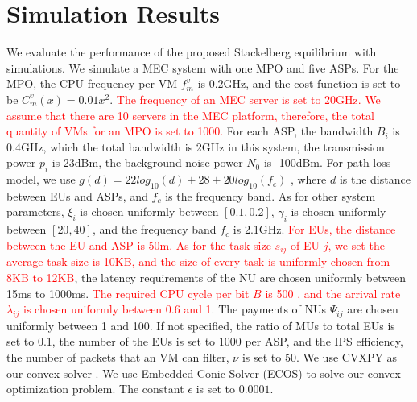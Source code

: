 \documentclass[10pt,journal, compsoc]{IEEEtran}
\begin{document}
\section{Simulation Results} \label{sec:simulation}
We evaluate the performance of the proposed Stackelberg equilibrium with simulations. We simulate a MEC system with one MPO and five ASPs\cite{Zhang3}\cite{Xu2}. For the MPO, the CPU frequency per VM $f_m^v$ is 0.2GHz, and the cost function is set to be $C_m^v(x) = 0.01x^2$. \textcolor{red}{The frequency of an MEC server is set to 20GHz\cite{Liu4}. We assume that there are 10 servers in the MEC platform, therefore, the total quantity of VMs for an MPO is set to 1000.} For each ASP, the bandwidth $B_i$ is 0.4GHz, which the total bandwidth is 2GHz in this system, the transmission power $p_i$ is 23dBm\cite{3gpp.36.101}, the background noise power $N_0$ is -100dBm\cite{chen2015efficient}. For path loss model, we use $g(d)=22log_{10}(d)+28+20log_{10}(f_c)$ \cite{3gpp.36.814}, where $d$ is the distance between EUs and ASPs, and $f_c$ is the frequency band. As for other system parameters, $\xi_{i}$ is chosen uniformly between $[0.1, 0.2]$, $\gamma_i$ is chosen uniformly between $[20, 40]$, and the frequency band $f_c$ is 2.1GHz\cite{Chang3}. \textcolor{red}{For EUs, the distance between the EU and ASP is 50m\cite{Mao}. As for the task size $s_{ij}$ of EU $j$, we set the average task size is 10KB\cite{Ko}, and the size of every task is uniformly chosen from 8KB to 12KB}, the latency requirements of the NU are chosen uniformly between 15ms to 1000ms. \textcolor{red}{The required CPU cycle per bit $B$ is 500 \cite{Ko}, and the arrival rate $\lambda_{ij}$ is chosen uniformly between 0.6 and 1\cite{Wu}}. The payments of NUs $\Psi_{ij}$ are chosen uniformly between 1 and 100. If not specified, the ratio of MUs to total EUs is set to 0.1, the number of the EUs is set to 1000 per ASP, and the IPS efficiency, the number of packets that an VM can filter, $\nu$ is set to 50. We use CVXPY \cite{diamond2016cvxpy} \cite{agrawal2018rewriting} as our convex solver . We use Embedded Conic Solver (ECOS) \cite{bib:Domahidi2013ecos} to solve our convex optimization problem. The constant $\epsilon$ is set to $0.0001$. 
\end{document}
